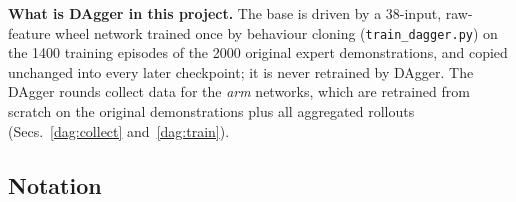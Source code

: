 \textbf{What is DAgger in this project.} The base is driven by a 38-input, raw-feature wheel network trained once by behaviour cloning (\texttt{train\_dagger.py}) on the 1400 training episodes of the 2000 original expert demonstrations, and copied unchanged into every later checkpoint; it is never retrained by DAgger. The DAgger rounds collect data for the \emph{arm} networks, which are retrained from scratch on the original demonstrations plus all aggregated rollouts (Secs.~\ref{dag:collect} and~\ref{dag:train}).

\subsection{Notation}
\label{dag:notation}

